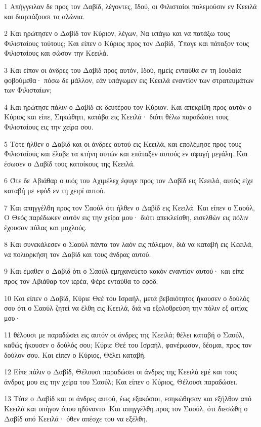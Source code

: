 \par 1 Απήγγειλαν δε προς τον Δαβίδ, λέγοντες, Ιδού, οι Φιλισταίοι πολεμούσιν εν Κεειλά και διαρπάζουσι τα αλώνια.
\par 2 Και ηρώτησεν ο Δαβίδ τον Κύριον, λέγων, Να υπάγω και να πατάξω τους Φιλισταίους τούτους; Και είπεν ο Κύριος προς τον Δαβίδ, Ύπαγε και πάταξον τους Φιλισταίους και σώσον την Κεειλά.
\par 3 Και είπον οι άνδρες του Δαβίδ προς αυτόν, Ιδού, ημείς ενταύθα εν τη Ιουδαία φοβούμεθα· πόσω δε μάλλον, εάν υπάγωμεν εις Κεειλά εναντίον των στρατευμάτων των Φιλισταίων;
\par 4 Και ηρώτησε πάλιν ο Δαβίδ εκ δευτέρου τον Κύριον. Και απεκρίθη προς αυτόν ο Κύριος και είπε, Σηκώθητι, κατάβα εις Κεειλά· διότι θέλω παραδώσει τους Φιλισταίους εις την χείρα σου.
\par 5 Τότε ήλθεν ο Δαβίδ και οι άνδρες αυτού εις Κεειλά, και επολέμησε προς τους Φιλισταίους και έλαβε τα κτήνη αυτών και επάταξεν αυτούς εν σφαγή μεγάλη. Και έσωσεν ο Δαβίδ τους κατοίκους της Κεειλά.
\par 6 Ότε δε Αβιάθαρ ο υιός του Αχιμέλεχ έφυγε προς τον Δαβίδ εις Κεειλά, αυτός είχε καταβή με εφόδ εν τη χειρί αυτού.
\par 7 Και απηγγέλθη προς τον Σαούλ ότι ήλθεν ο Δαβίδ εις Κεειλά. Και είπεν ο Σαούλ, Ο Θεός παρέδωκεν αυτόν εις την χείρα μου· διότι απεκλείσθη, εισελθών εις πόλιν έχουσαν πύλας και μοχλούς.
\par 8 Και συνεκάλεσεν ο Σαούλ πάντα τον λαόν εις πόλεμον, διά να καταβή εις Κεειλά, να πολιορκήση τον Δαβίδ και τους άνδρας αυτού.
\par 9 Και έμαθεν ο Δαβίδ ότι ο Σαούλ εμηχανεύετο κακόν εναντίον αυτού· και είπε προς τον Αβιάθαρ τον ιερέα, Φέρε ενταύθα το εφόδ.
\par 10 Και είπεν ο Δαβίδ, Κύριε Θεέ του Ισραήλ, μετά βεβαιότητος ήκουσεν ο δούλός σου ότι ο Σαούλ ζητεί να έλθη εις Κεειλά, διά να εξολοθρεύση την πόλιν εξ αιτίας μου·
\par 11 θέλουσι με παραδώσει εις αυτόν οι άνδρες της Κεειλά; θέλει καταβή ο Σαούλ, καθώς ήκουσεν ο δούλός σου; Κύριε Θεέ του Ισραήλ, φανέρωσον, δέομαι, προς τον δούλον σου. Και είπεν ο Κύριος, Θέλει καταβή.
\par 12 Είπε πάλιν ο Δαβίδ, Θέλουσι παραδώσει οι άνδρες της Κεειλά εμέ και τους άνδρας μου εις την χείρα του Σαούλ; Και είπεν ο Κύριος, Θέλουσι παραδώσει.
\par 13 Τότε ο Δαβίδ και οι άνδρες αυτού, έως εξακόσιοι, εσηκώθησαν και εξήλθον από Κεειλά και υπήγον όπου ηδύναντο. Και απηγγέλθη προς τον Σαούλ, ότι διεσώθη ο Δαβίδ από Κεειλά· όθεν απέσχε του να εξέλθη.
